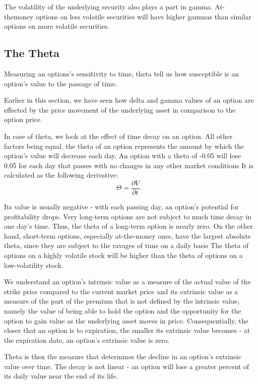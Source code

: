 \documentclass[a4paper, 12pt]{article}
\theoremstyle{definition}
\theoremstyle{plain}
\theoremstyle{definition}
\begin{document}
The volatility of the underlying security also plays a part in gamma. 
At-themoney options on less volatile securities will have higher gammas than similar options
on more volatile securities. 

\subsection{The Theta}

Measuring an options's sensitivity to time, 
theta tell us how susceptible is an option's value 
to the passage of time. 

Earlier in this section, we have seen how delta and gamma
values of an option are effected by the price movement 
of the underlying asset in comparison to the option price.

In case of theta, we look at the effect of time decay 
on an option. All other factors being equal, the theta of 
an option represents the amount by which the option's value 
will decrease each day. 
An option with a theta of -0.05 will lose 0.05 for each day that passes
with no changes in any other market conditions
It is calculated as the following 
derivative:
$$
\Theta = \frac{\partial V}{\partial t}.
$$

Its value is usually negative - with each passing day, 
an option's potential for profitability drops.
Very long-term options are not subject to much time decay in one day's time.
Thus, the theta of a long-term option is nearly zero. On the other hand, short-term
options, especially at-the-money ones, have the largest absolute theta, since they are
subject to the ravages of time on a daily basis
The theta of options on a highly volatile
stock will be higher than the theta of options on a low-volatility stock.

We understand an option's intrinsic value as a measure 
of the actual value of the strike price compared to the 
current market price and its extrinsic value as a measure 
of the part of the premium that is not defined by 
the intrinsic value, namely the value of being able to 
hold the option and the opportunity for the option to gain 
value as the underlying asset moves in price. Consequentially,
the closer that an option is to expiration, the smaller 
its extrinsic value becomes - at the expiration date, 
an option's extrinsic value is zero.

Theta is then the measure that determines the decline in 
an option's extrinsic value over time.
The decay is not linear - an option will lose a greater percent of its daily value
near the end of its life. 
\end{document}
